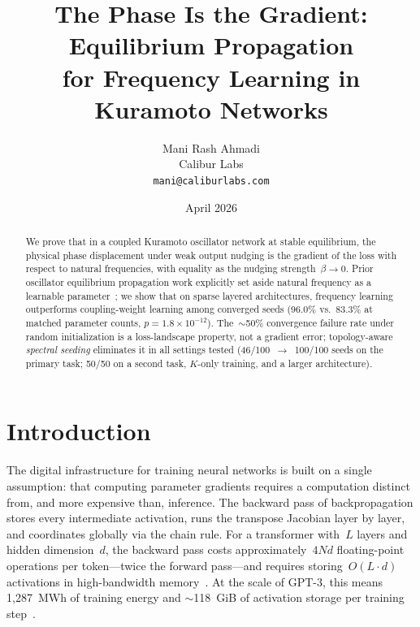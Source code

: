 \documentclass[11pt,a4paper]{article}
\begin{document}
\title{%
  The Phase Is the Gradient: Equilibrium Propagation\\
  for Frequency Learning in Kuramoto Networks
}

\author{
  Mani Rash Ahmadi\\
  Calibur Labs\\
  \texttt{mani@caliburlabs.com}
}

\date{April 2026}

\maketitle

\begin{abstract}
We prove that in a coupled Kuramoto oscillator network at stable
equilibrium, the physical phase displacement under weak output nudging
is the gradient of the loss with respect to natural frequencies, with
equality as the nudging strength~$\beta \to 0$. Prior oscillator
equilibrium propagation work explicitly set aside natural frequency as a
learnable parameter~\citep{wang2024training}; we show that on sparse
layered architectures, frequency learning outperforms coupling-weight
learning among converged seeds (96.0\% vs.\ 83.3\% at matched parameter
counts, $p = 1.8 \times 10^{-12}$). The~$\sim$50\% convergence failure rate under
random initialization is a loss-landscape property, not a gradient error;
topology-aware \emph{spectral seeding} eliminates it in all settings
tested (46/100~$\to$~100/100 seeds on the primary task; 50/50 on a
second task, $K$-only training, and a larger architecture).
\end{abstract}

\section{Introduction}
\label{sec:intro}

The digital infrastructure for training neural networks is built on a
single assumption: that computing parameter gradients requires a
computation distinct from, and more expensive than, inference. The backward
pass of backpropagation stores every intermediate activation, runs the
transpose Jacobian layer by layer, and coordinates globally via the chain
rule. For a transformer with~$L$ layers and hidden dimension~$d$, the
backward pass costs approximately~$4Nd$ floating-point operations per
token---twice the forward pass---and requires storing~$O(L \cdot d)$
activations in high-bandwidth memory~\citep{korthikanti2023reducing}. At
the scale of GPT-3, this means 1{,}287~MWh of training energy and
$\sim$118~GiB of activation storage per training
step~\citep{patterson2021carbon}.
\end{document}
